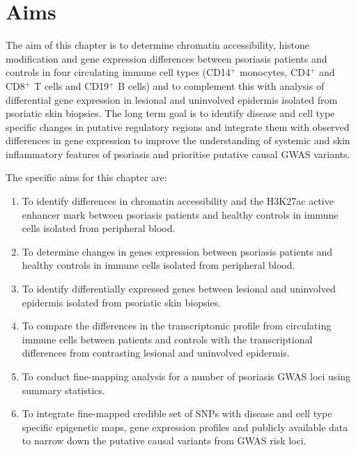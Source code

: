 


\section{Aims}
The aim of this chapter is to determine chromatin accessibility, histone modification and gene expression differences between psoriasis patients and controls in four circulating immune cell types (CD14$^+$ monocytes, CD4$^+$ and CD8$^+$ T cells and CD19$^+$ B cells) and to complement this with analysis of differential gene expression in lesional and uninvolved epidermis isolated from psoriatic skin biopsies. The long term goal is to identify disease and cell type specific changes in putative regulatory regions and integrate them with observed differences in gene expression to improve the understanding of systemic and skin inflammatory features of psoriasis and prioritise putative causal GWAS variants.

The specific aims for this chapter are:

\begin{enumerate}
\item To identify differences in chromatin accessibility and the H3K27ac active enhancer mark between psoriasis patients and healthy controls in immune cells isolated from peripheral blood.
\item To determine changes in genes expression between psoriasis patients and healthy controls in immune cells isolated from peripheral blood.
\item To identify differentially expressed genes between lesional and uninvolved epidermis isolated from psoriatic skin biopsies. 
\item To compare the differences in the transcriptomic profile from circulating immune cells between patients and controls with the transcriptional differences from contrasting lesional and uninvolved epidermis.  
\item To conduct fine-mapping analysis for a number of psoriasis GWAS loci using summary statistics.
\item To integrate fine-mapped credible set of SNPs with disease and cell type specific epigenetic maps, gene expression profiles and publicly available data to narrow down the putative causal variants from GWAS risk loci.
\end{enumerate}


